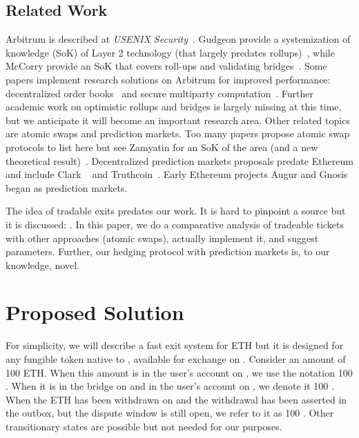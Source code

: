 \subsection{Related Work} 

Arbitrum is described at \textit{USENIX Security}~\cite{kalodner2018arbitrum}. Gudgeon \etal provide a systemization of knowledge (SoK) of Layer 2 technology (that largely predates rollups)~\cite{gudgeon2019sok}, while McCorry \etal provide an SoK that covers roll-ups and validating bridges~\cite{mccorry2021sok}. Some papers implement research solutions on Arbitrum for improved performance:  decentralized order books~\cite{moosavi2021lissy} and secure multiparty computation~\cite{demirag2021absentia}. Further academic work on optimistic rollups and bridges is largely missing at this time, but we anticipate it will become an important research area.  Other related topics are atomic swaps and prediction markets. Too many papers propose atomic swap protocols to list here but see Zamyatin \etal for an SoK of the area (and a new theoretical result)~\cite{zamyatin2021sok}. Decentralized prediction markets proposals predate Ethereum and include Clark \etal~\cite{clark2014decentralizing} and Truthcoin~\cite{sztorc2015truthcoin}. Early Ethereum projects Augur and Gnosis began as prediction markets. 

The idea of tradable exits predates our work. It is hard to pinpoint a source but it is discussed: . In this paper, we do a comparative analysis of tradeable tickets with other approaches (atomic swaps), actually implement it, and suggest parameters. Further, our hedging protocol with prediction markets is, to our knowledge, novel.


\section{Proposed Solution} 

For simplicity, we will describe a fast exit system for ETH but it is designed for any fungible token native to \layerone, available for exchange on \layerone. Consider an amount of 100 ETH. When this amount is in the user's account on \layerone, we use the notation 100 \ethone. When it is in the bridge on \layerone and in the user's account on \layertwo, we denote it 100 \ethtwo. When the ETH has been withdrawn on \layertwo and the withdrawal has been asserted in the \layerone outbox, but the dispute window is still open, we refer to it as 100 \ethxx. Other transitionary states are possible but not needed for our purposes.

